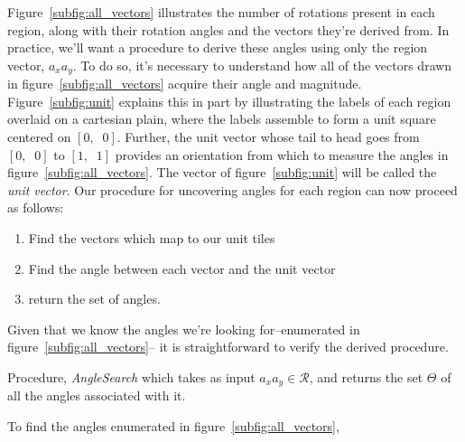 Figure~\ref{subfig:all_vectors} illustrates the number of rotations present in each
region, along
with their rotation angles and the vectors they're derived from.  In practice, we'll
want a procedure to
derive these angles using only the region vector, $a_xa_y$.  To do so, it's necessary
to understand how
all of the vectors drawn in figure~\ref{subfig:all_vectors} acquire their angle and
magnitude.
Figure~\ref{subfig:unit} explains this in part by
illustrating the labels of each
region overlaid on a
cartesian plain, where the labels assemble to form a unit square centered on
$[0, \;\; 0]$.
Further, the unit vector whose
tail to head goes from $[0, \;\; 0]$ to $[1, \;\; 1]$ provides an orientation from
which to measure the angles in figure~\ref{subfig:all_vectors}.
  The vector of figure~\ref{subfig:unit} will be
  called the {\it unit vector}.  Our procedure for uncovering angles
for each region can now proceed as follows:
\begin{enumerate}
  \item Find the vectors which map to our unit tiles
  \item Find the angle between each vector and the unit vector
  \item return the set of angles.
\end{enumerate}
Given that we know the angles we're looking for--enumerated in figure~\ref{subfig:all_vectors}--
it is straightforward to verify the derived procedure.
\begin{algorithm}[hb]
  \setcounter{AlgoLine}{0}
  \caption{Procedure, {\it AngleSearch} which takes as input $a_xa_y \in \mathcal{R}$,
  and returns the set $\Theta$ of all the angles associated with it.}
  \label{alg:angle_search}
\end{algorithm}
To find the angles enumerated in figure~\ref{subfig:all_vectors},
